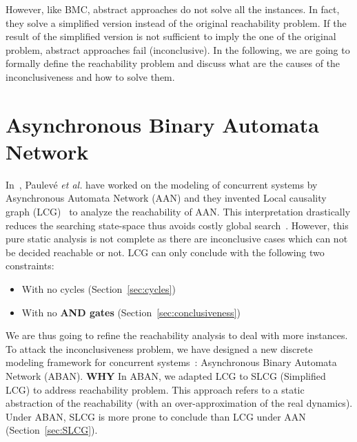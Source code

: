 However, like BMC, abstract approaches do not solve all the instances.
In fact, they solve a simplified version instead of the original reachability problem.
If the result of the simplified version is not sufficient to imply the one of the original problem, abstract approaches fail (inconclusive).
In the following, we are going to formally define the reachability problem and discuss what are the causes of the inconclusiveness and how to solve them. 

\section{Asynchronous Binary Automata Network}
In~\cite{folschette2015}, Paulev\'e \textit{et al.} have worked on the modeling of concurrent systems by Asynchronous Automata Network (AAN) and they invented Local causality graph (LCG)~\cite{pauleve2017reduction,folschette2015,pauleve2011} to analyze the reachability of AAN.
This interpretation drastically reduces the searching state-space thus avoids costly global search~\cite{pauleve2012}. 
However, this pure static analysis is not complete as there are inconclusive cases which can not be decided reachable or not.
LCG can only conclude with the following two constraints:

\begin{itemize}
    \item With no cycles (Section~\ref{sec:cycles})
    \item With no \textbf{AND gates} (Section~\ref{sec:conclusiveness})
\end{itemize}

We are thus going to refine the reachability analysis to deal with more instances.
To attack the inconclusiveness problem, we have designed a new discrete modeling framework for concurrent systems~\cite{chai2018heuristic}: Asynchronous Binary Automata Network (ABAN).
\textbf{WHY} In ABAN, we adapted LCG to SLCG (Simplified LCG) to address reachability problem.
This approach refers to a static abstraction of the reachability (with an over-approximation of the real dynamics).
Under ABAN, SLCG is more prone to conclude than LCG under AAN (Section~\ref{sec:SLCG}).

